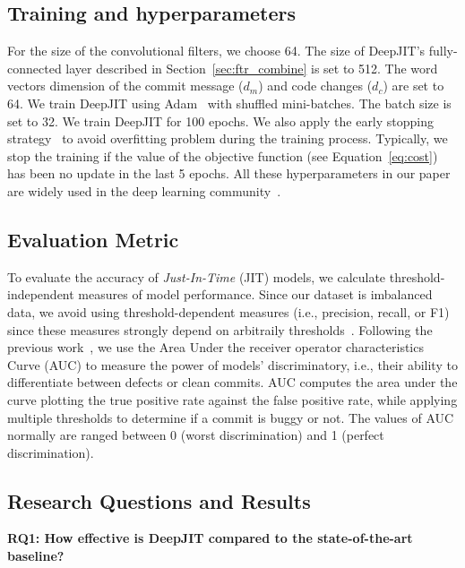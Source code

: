\subsection{Training and hyperparameters}
\label{sec:training_parameters}
For the size of the convolutional filters, we choose 64. The size of DeepJIT's fully-connected layer described in Section~\ref{sec:ftr_combine} is set to 512. The word vectors dimension of the commit message ($d_m$) and code changes ($d_c$) are set to 64. We train DeepJIT using Adam~\cite{kingma2014adam} with shuffled mini-batches.  The batch size is set to 32. We train DeepJIT for 100 epochs. We also apply the early stopping strategy~\cite{prechelt1998automatic, caruana2001overfitting} to avoid overfitting problem during the training process. Typically, we stop the training if the value of the objective function (see Equation~\ref{eq:cost}) has been no update in the last 5 epochs. All these hyperparameters in our paper are widely used in the deep learning community~\cite{severyn2015learning, huo2016learning, huo2017enhancing, hinton2012improving}. 
 
\subsection{Evaluation Metric}
\label{sec:metric}
To evaluate the accuracy of \emph{Just-In-Time} (JIT) models, we calculate  threshold-independent measures of model performance. Since our dataset is imbalanced data, we avoid using threshold-dependent measures (i.e., precision, recall, or F1) since these measures strongly depend on arbitraily thresholds~\cite{nguyen2009learning, gu2008data}. Following the previous work~\cite{mcintosh2018fix},  we use the Area Under the receiver operator characteristics
Curve (AUC) to measure the power of models' discriminatory, i.e., their ability to differentiate between defects or clean commits. AUC computes the area under the curve plotting the true positive rate against the false positive rate, while applying multiple thresholds to determine if a commit is buggy or not. The values of AUC normally are ranged between 0 (worst discrimination) and 1 (perfect discrimination). 

\subsection{Research Questions and Results}
\label{sec:rq_results}

\noindent \textbf{RQ1: How effective is DeepJIT compared to the state-of-the-art baseline?}


